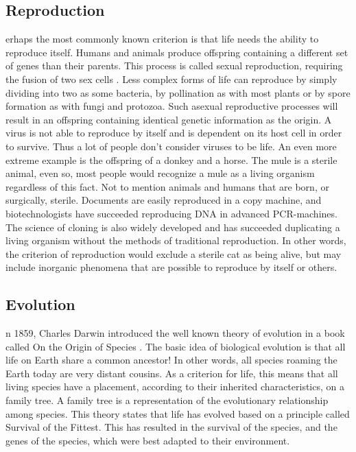 \subsection*{Reproduction}
erhaps the most commonly known criterion is that life needs the ability to reproduce itself.
Humans and animals produce offspring containing a different set of genes than their parents.
This process is called sexual reproduction, requiring the fusion of two sex cells \cite{reprod}.
Less complex forms of life can reproduce by simply dividing into two as some bacteria, by pollination as with most plants or by spore formation as with fungi and protozoa.
Such asexual reproductive processes will result in an offspring containing identical genetic information as the origin.
A virus is not able to reproduce by itself and is dependent on its host cell in order to survive.
Thus a lot of people don't consider viruses to be life.
An even more extreme example is the offspring of a donkey and a horse.
The mule is a sterile animal, even so, most people would recognize a mule as a living organism regardless of this fact. 
Not to mention animals and humans that are born, or surgically, sterile.
Documents are easily reproduced in a copy machine, and biotechnologists have succeeded reproducing DNA in advanced PCR-machines.
The science of cloning is also widely developed and has succeeded duplicating a living organism without the methods of traditional reproduction.
In other words, the criterion of reproduction would exclude a sterile cat as being alive, but may include inorganic phenomena that are possible to reproduce by itself or others.

\subsection*{Evolution}
n 1859, Charles Darwin introduced the well known theory of evolution in a book called On the Origin of Species \cite{Darwin}.
The basic idea of biological evolution is that all life on Earth share a common ancestor!
In other words, all species roaming the Earth today are very distant cousins.
As a criterion for life, this means that all living species have a placement, according to their inherited characteristics, on a family tree.
A family tree is a representation of the evolutionary relationship among species.
This theory states that life has evolved based on a principle called Survival of the Fittest.
This has resulted in the survival of the species, and the genes of the species, which were best adapted to their environment. 

